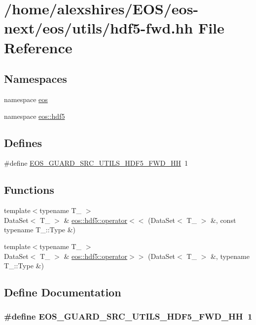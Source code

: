\hypertarget{hdf5-fwd_8hh}{
\section{/home/alexshires/EOS/eos-\/next/eos/utils/hdf5-\/fwd.hh File Reference}
\label{hdf5-fwd_8hh}
}
\subsection*{Namespaces}
\begin{DoxyCompactItemize}
\item 
namespace \hyperlink{namespaceeos}{eos}
\item 
namespace \hyperlink{namespaceeos_1_1hdf5}{eos::hdf5}
\end{DoxyCompactItemize}
\subsection*{Defines}
\begin{DoxyCompactItemize}
\item 
\#define \hyperlink{hdf5-fwd_8hh_ae87fcd0aa23afe6d8abfcf6373091c4d}{EOS\_\-GUARD\_\-SRC\_\-UTILS\_\-HDF5\_\-FWD\_\-HH}~1
\end{DoxyCompactItemize}
\subsection*{Functions}
\begin{DoxyCompactItemize}
\item 
{\footnotesize template$<$typename T\_\- $>$ }\\DataSet$<$ T\_\- $>$ \& \hyperlink{namespaceeos_1_1hdf5_a8da5ea7dae12acf02081ea4fc320dc3a}{eos::hdf5::operator$<$$<$} (DataSet$<$ T\_\- $>$ \&, const typename T\_\-::Type \&)
\item 
{\footnotesize template$<$typename T\_\- $>$ }\\DataSet$<$ T\_\- $>$ \& \hyperlink{namespaceeos_1_1hdf5_a59f5217285970b223b8a4932b811106e}{eos::hdf5::operator$>$$>$} (DataSet$<$ T\_\- $>$ \&, typename T\_\-::Type \&)
\end{DoxyCompactItemize}


\subsection{Define Documentation}
\hypertarget{hdf5-fwd_8hh_ae87fcd0aa23afe6d8abfcf6373091c4d}{
\subsubsection[{EOS\_\-GUARD\_\-SRC\_\-UTILS\_\-HDF5\_\-FWD\_\-HH}]{\setlength{\rightskip}{0pt plus 5cm}\#define EOS\_\-GUARD\_\-SRC\_\-UTILS\_\-HDF5\_\-FWD\_\-HH~1}}
\label{hdf5-fwd_8hh_ae87fcd0aa23afe6d8abfcf6373091c4d}

